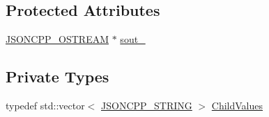 \subsection*{Protected Attributes}
\begin{DoxyCompactItemize}
\item 
\hyperlink{json_8hpp_a37a25be5fca174927780caeb280094ce}{J\+S\+O\+N\+C\+P\+P\+\_\+\+O\+S\+T\+R\+E\+AM} $\ast$ \hyperlink{classJson_1_1StreamWriter_a4f5603d4228a9fa46a42cb44e5234d9b}{sout\+\_\+}
\end{DoxyCompactItemize}
\subsection*{Private Types}
\begin{DoxyCompactItemize}
\item 
typedef std\+::vector$<$ \hyperlink{json_8hpp_a1e723f95759de062585bc4a8fd3fa4be}{J\+S\+O\+N\+C\+P\+P\+\_\+\+S\+T\+R\+I\+NG} $>$ \hyperlink{structJson_1_1BuiltStyledStreamWriter_a63196b38400e5ce452f65ce856d47b6f}{Child\+Values}
\end{DoxyCompactItemize}
